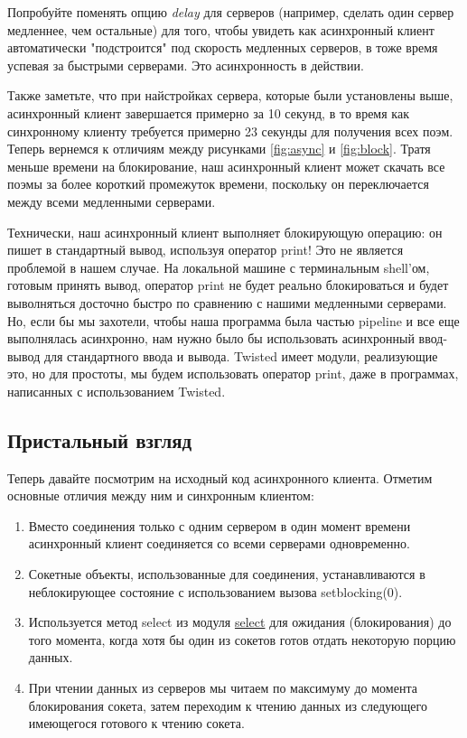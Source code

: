 Попробуйте поменять опцию \textit{delay} 
для серверов (например, сделать 
один сервер медленнее, чем остальные) для того, чтобы увидеть 
как асинхронный клиент автоматически "подстроится" под скорость 
медленных серверов, в тоже время успевая за быстрыми серверами. 
Это асинхронность в действии. 


Также заметьте, что при найстройках сервера, которые были установлены 
выше, асинхронный 
клиент завершается примерно за 10 секунд, в то время как 
синхронному клиенту требуется примерно 23 секунды для получения 
всех поэм. Теперь вернемся к отличиям между рисунками \ref{fig:async} и 
\ref{fig:block}. Тратя меньше времени на блокирование, наш 
асинхронный клиент может скачать все поэмы за более короткий промежуток 
времени, поскольку он переключается между всеми медленными серверами.


Технически, наш асинхронный клиент выполняет блокирующую операцию: 
он пишет в стандартный вывод, используя оператор print! Это не 
является проблемой в нашем случае. На локальной машине с 
терминальным shell'ом, готовым принять вывод, оператор print 
не будет реально блокироваться и будет выволняться досточно быстро 
по сравнению с нашими медленными серверами. Но, если бы мы захотели, 
чтобы наша программа была частью pipeline и все еще выполнялась 
асинхронно, нам нужно было бы использовать асинхронный ввод-вывод 
для стандартного ввода и вывода. Twisted имеет модули, реализующие это, 
но для простоты, мы будем использовать 
оператор print, даже в программах, написанных с использованием Twisted.


\subsection{Пристальный взгляд}


    Теперь давайте посмотрим на исходный код асинхронного клиента. 
Отметим основные отличия между ним и синхронным клиентом:

\begin{enumerate}
\item Вместо соединения только с одним сервером в один момент времени  
асинхронный клиент соединяется со всеми серверами одновременно.

\item Сокетные объекты, использованные для соединения, устанавливаются в неблокирующее 
состояние с использованием вызова setblocking(0).

\item Используется метод select из модуля 
\href{http://docs.python.org/library/select.html#module-select}{select} для ожидания (блокирования) 
до того момента, когда хотя бы один из сокетов готов отдать некоторую 
порцию данных.

\item При чтении данных из серверов мы читаем по максимуму до 
момента блокирования сокета, затем переходим к чтению данных 
из следующего имеющегося готового к чтению сокета. 
\end{enumerate}


